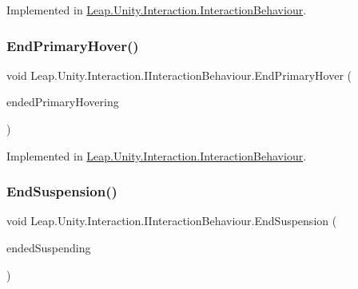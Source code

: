 Implemented in \mbox{\hyperlink{class_leap_1_1_unity_1_1_interaction_1_1_interaction_behaviour_a1011d32c8a3d054552d47ec44517d22e}{Leap.\+Unity.\+Interaction.\+Interaction\+Behaviour}}.

\mbox{\label{interface_leap_1_1_unity_1_1_interaction_1_1_i_interaction_behaviour_aeb05af074ee371e099c900f2970b74d7}} 
\subsubsection{\texorpdfstring{EndPrimaryHover()}{EndPrimaryHover()}}
{\footnotesize\ttfamily void Leap.\+Unity.\+Interaction.\+I\+Interaction\+Behaviour.\+End\+Primary\+Hover (\begin{DoxyParamCaption}\item[{List$<$ \mbox{\hyperlink{class_leap_1_1_unity_1_1_interaction_1_1_interaction_controller}{Interaction\+Controller}} $>$}]{ended\+Primary\+Hovering }\end{DoxyParamCaption})}



Implemented in \mbox{\hyperlink{class_leap_1_1_unity_1_1_interaction_1_1_interaction_behaviour_a743fa15f979906b13265632db30c2d9c}{Leap.\+Unity.\+Interaction.\+Interaction\+Behaviour}}.

\mbox{\label{interface_leap_1_1_unity_1_1_interaction_1_1_i_interaction_behaviour_a7be9c13a479bebdd78fbfcdd67a2304f}} 
\subsubsection{\texorpdfstring{EndSuspension()}{EndSuspension()}}
{\footnotesize\ttfamily void Leap.\+Unity.\+Interaction.\+I\+Interaction\+Behaviour.\+End\+Suspension (\begin{DoxyParamCaption}\item[{\mbox{\hyperlink{class_leap_1_1_unity_1_1_interaction_1_1_interaction_controller}{Interaction\+Controller}}}]{ended\+Suspending }\end{DoxyParamCaption})}



